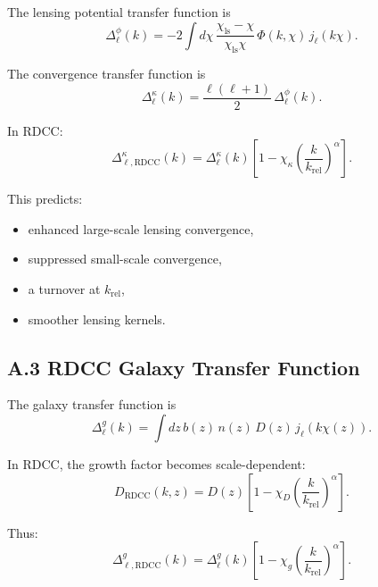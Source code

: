 \documentclass[11pt,a4paper]{article}
\begin{document}
The lensing potential transfer function is
\begin{equation}
    \Delta_{\ell}^{\phi}(k)
    = -2 \int d\chi\,
      \frac{\chi_{\mathrm{ls}}-\chi}{\chi_{\mathrm{ls}}\chi}\,
      \Phi(k,\chi)\,
      j_{\ell}(k\chi).
\end{equation}

The convergence transfer function is
\begin{equation}
    \Delta_{\ell}^{\kappa}(k)
    = \frac{\ell(\ell+1)}{2}\,
      \Delta_{\ell}^{\phi}(k).
\end{equation}

In RDCC:
\begin{equation}
    \Delta_{\ell,\mathrm{RDCC}}^{\kappa}(k)
    = \Delta_{\ell}^{\kappa}(k)
      \left[
        1 - \chi_{\kappa}
        \left(\frac{k}{k_{\mathrm{rel}}}\right)^{\alpha}
      \right].
\end{equation}

This predicts:

\begin{itemize}
    \item enhanced large-scale lensing convergence,
    \item suppressed small-scale convergence,
    \item a turnover at $k_{\mathrm{rel}}$,
    \item smoother lensing kernels.
\end{itemize}

\subsection*{A.3 RDCC Galaxy Transfer Function}

The galaxy transfer function is
\begin{equation}
    \Delta_{\ell}^{g}(k)
    = \int dz\,
      b(z)\,n(z)\,D(z)\,
      j_{\ell}(k\chi(z)).
\end{equation}

In RDCC, the growth factor becomes scale-dependent:
\begin{equation}
    D_{\mathrm{RDCC}}(k,z)
    = D(z)
      \left[
        1 - \chi_{D}
        \left(\frac{k}{k_{\mathrm{rel}}}\right)^{\alpha}
      \right].
\end{equation}

Thus:
\begin{equation}
    \Delta_{\ell,\mathrm{RDCC}}^{g}(k)
    = \Delta_{\ell}^{g}(k)
      \left[
        1 - \chi_{g}
        \left(\frac{k}{k_{\mathrm{rel}}}\right)^{\alpha}
      \right].
\end{equation}
\end{document}
